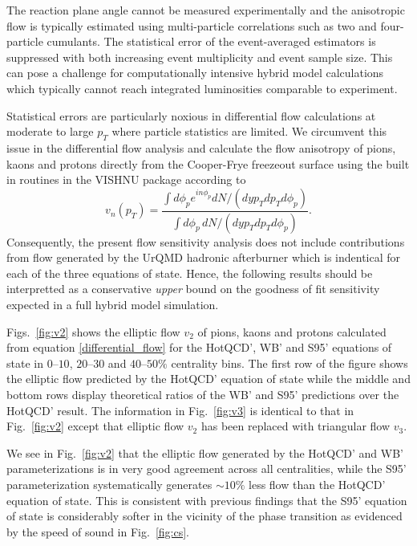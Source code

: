 \documentclass[aps,prc,reprint,amsmath,nofootinbib,superscriptaddress]{revtex4-1}
\begin{document}
The reaction plane angle cannot be measured experimentally and the anisotropic flow is typically estimated using multi-particle correlations such as two and four-particle cumulants. The statistical error of the 
event-averaged estimators is suppressed with both increasing event multiplicity and event sample size. This can pose a challenge for computationally intensive hybrid model calculations which typically cannot 
reach integrated luminosities comparable to experiment. 

Statistical errors are particularly noxious in differential flow calculations at moderate to large $p_T$ where particle statistics are limited. We circumvent this issue in the differential flow 
analysis and calculate the flow anisotropy of pions, kaons and protons directly from the Cooper-Frye freezeout surface using the built in routines in the VISHNU package according to
\begin{equation}
 \label{differential_flow}
 v_n(p_T) = \frac{\int d\phi_p e^{i n \phi_p} dN/(dy p_T dp_T d\phi_p)}{\int d\phi_p\, dN/(dy p_T dp_T d\phi_p)}.
\end{equation}
Consequently, the present flow sensitivity analysis does not include contributions from flow generated by the UrQMD hadronic afterburner which is indentical for each of the three equations of state. Hence, the following
results should be interpretted as a conservative \emph{upper} bound on the goodness of fit sensitivity expected in a full hybrid model simulation.

Figs.~\ref{fig:v2} shows the elliptic flow $v_2$ of pions, kaons and protons calculated from equation \eqref{differential_flow} for the HotQCD', WB' and S95' equations of state in $0$--$10$, $20$--$30$ and $40$--$50\%$ centrality bins. 
The first row of the figure shows the elliptic flow predicted by the HotQCD' equation of state while the middle and bottom rows display theoretical ratios of the WB' and S95' predictions over the HotQCD' result. The information
in Fig.~\ref{fig:v3} is identical to that in Fig.~\ref{fig:v2} except that elliptic flow $v_2$ has been replaced with triangular flow $v_3$.

We see in Fig.~\ref{fig:v2} that the elliptic flow generated by the HotQCD' and WB' parameterizations is in very good agreement across all centralities, while the S95' parameterization systematically generates $\sim 10\%$ less 
flow than the HotQCD' equation of state. This is consistent with previous findings that the S95' equation of state is considerably softer in the vicinity of the phase transition as evidenced by the 
speed of sound in Fig.~\ref{fig:cs}. 
\end{document}
